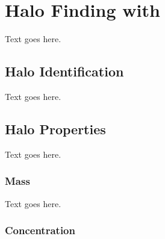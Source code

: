 
%
%

\section{Halo Finding with \rockstar}
\label{sec:rockstar}



Text goes here.




\subsection{Halo Identification}
\label{subsec:rockstar--halo_identification}


Text goes here.




\subsection{Halo Properties}
\label{subsec:rockstar--halo_properties}


Text goes here.



\subsubsection{Mass}
\label{subsubsec:rockstar--halo_properties--mass}


Text goes here.



\subsubsection{Concentration}
\label{subsubsec:rockstar--halo_properties--concentration}


